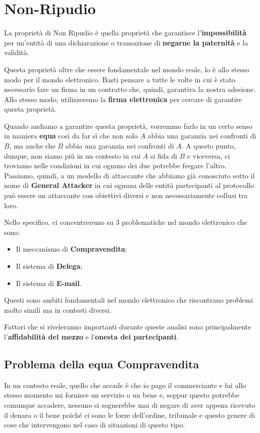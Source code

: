 \chapter{Non-Ripudio}
La proprietà di Non Ripudio è quella proprietà che garantisce l'\textbf{impossibilità} per un'entità di una dichiarazione o transazione di \textbf{negarne la paternità} e la validità.

Questa proprietà oltre che essere fondamentale nel mondo reale, lo è allo stesso modo per il mondo elettronico. Basti pensare a tutte le volte in cui è stato necessario fare un firma in un contratto che, quindi, garantiva la nostra adesione. Allo stesso modo, utilizzeremo la \textbf{firma elettronica} per cercare di garantire questa proprietà.

Quando andiamo a garantire questa proprietà, vorremmo farlo in un certo senso in maniera \textbf{equa} così da far sì che non solo $A$ abbia una garanzia nei confronti di $B$, ma anche che $B$ abbia una garanzia nei confronti di $A$. A questo punto, dunque, non siamo più in un contesto in cui $A$ si fida di $B$ e viceversa, ci troviamo nelle condizioni in cui ognuno dei due potrebbe fregare l'altro. Passiamo, quindi, a un modello di attaccante che abbiamo già conosciuto sotto il nome di \textbf{General Attacker} in cui ognuna delle entità partecipanti al protocollo può essere un attaccante con obiettivi diversi e non necessariamente collusi tra loro. 

Nello specifico, ci concentreremo su 3 problematiche nel mondo elettronico che sono:
\begin{itemize}
    \item Il meccanismo di \textbf{Compravendita};
    \item Il sistema di \textbf{Delega};
    \item Il sistema di \textbf{E-mail}.
\end{itemize}
Questi sono ambiti fondamentali nel mondo elettronico che riscontrano problemi molto simili ma in contesti diversi.

Fattori che si riveleranno importanti durante queste analisi sono principalmente l'\textbf{affidabilità del mezzo} e l'\textbf{onesta dei partecipanti}.

\section{Problema della equa Compravendita}
In un contesto reale, quello che accade è che io pago il commerciante e lui allo stesso momento mi fornisce un servizio o un bene e, seppur questo potrebbe comunque accadere, nessuno si sognerebbe mai di negare di aver appena ricevuto il denaro o il bene poiché ci sono le forze dell'ordine, tribunale e questo genere di cose che intervengono nel caso di situazioni di questo tipo. 

